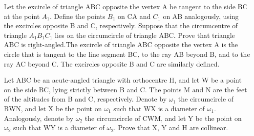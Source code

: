 \item Let the excircle of triangle ABC opposite the vertex A be tangent to the side BC at the point $A_1$. Define the points $B_1$ on CA and $C_1$ on AB analogously, using the excircles opposite B and C, respectively. Suppose that the circumcentre of triangle $A_1B_1C_1$ lies on the circumcircle of triangle ABC. Prove that triangle ABC is right-angled.The excircle of triangle ABC opposite the vertex A is the circle that is tangent to the line segment BC, to the ray AB beyond B, and to the ray AC beyond C. The excircles opposite B and C are similarly defined.

\item Let ABC be an acute-angled triangle with orthocentre H, and let W be a point on the side BC, lying strictly between B and C. The points M and N are the feet of the altitudes from B and C, respectively. Denote by $\omega_1$ the circumcircle of BWN, and let X be the point on $\omega_1$ such that WX is a diameter of $\omega_1$. Analogously, denote by $\omega_2$ the circumcircle of CWM, and let Y be the point on $\omega_2$ such that WY is a diameter of $\omega_2$. Prove that X, Y and H are collinear.
